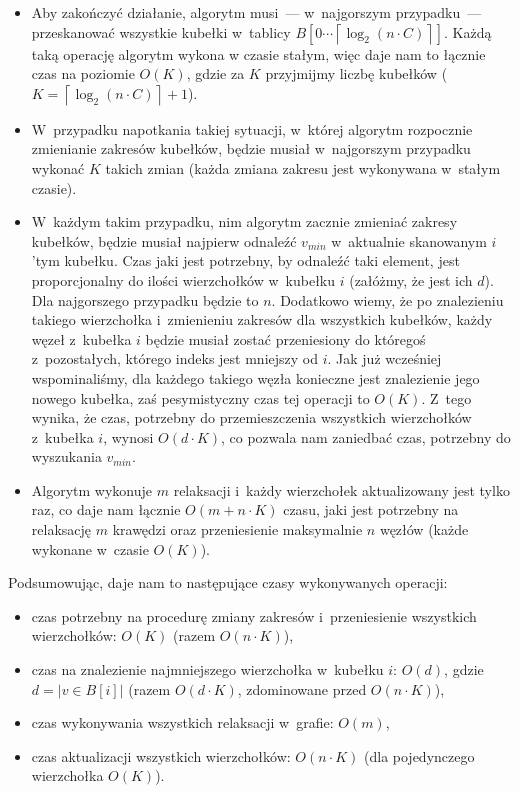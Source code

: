 \begin{itemize}
\item Aby zakończyć działanie, algorytm musi~--- w~najgorszym przypadku~--- przeskanować wszystkie kubełki w~tablicy $B \left[ 0 \cdots \left \lceil \log_{2} \left( n \cdot C \right) \right \rceil \right]$. Każdą taką operację algorytm wykona w czasie stałym, więc daje nam to łącznie czas na poziomie $O \left( K \right)$, gdzie za $K$ przyjmijmy liczbę kubełków ($K = \left \lceil \log_{2} \left( n \cdot C \right) \right \rceil + 1$).
\item W~przypadku napotkania takiej sytuacji, w~której algorytm rozpocznie zmienianie zakresów kubełków, będzie musiał w~najgorszym przypadku wykonać $K$ takich zmian (każda zmiana zakresu jest wykonywana w~stałym czasie).
\item W~każdym takim przypadku, nim algorytm zacznie zmieniać zakresy kubełków, będzie musiał najpierw odnaleźć $v_{min}$ w~aktualnie skanowanym $i$'tym kubełku. Czas jaki jest potrzebny, by odnaleźć taki element, jest proporcjonalny do ilości wierzchołków w~kubełku $i$ (załóżmy, że jest ich $d$). Dla najgorszego przypadku będzie to $n$. Dodatkowo wiemy, że po znalezieniu takiego wierzchołka i~zmienieniu zakresów dla wszystkich kubełków, każdy węzeł z~kubełka $i$ będzie musiał zostać przeniesiony do któregoś z~pozostałych, którego indeks jest mniejszy od $i$. Jak już wcześniej wspominaliśmy, dla każdego takiego węzła konieczne jest znalezienie jego nowego kubełka, zaś pesymistyczny czas tej operacji to $O \left( K \right)$. Z~tego wynika, że czas, potrzebny do przemieszczenia wszystkich wierzchołków z~kubełka $i$, wynosi $ O \left( d \cdot K \right)$, co pozwala nam zaniedbać czas, potrzebny do wyszukania $v_{min}$.
\item Algorytm wykonuje $m$ relaksacji i~każdy wierzchołek aktualizowany jest tylko raz, co daje nam łącznie $O \left( m + n \cdot K \right)$ czasu, jaki jest potrzebny na relaksację $m$ krawędzi oraz przeniesienie maksymalnie $n$ węzłów (każde wykonane w~czasie $O \left( K\right)$).
\end{itemize}

Podsumowując, daje nam to następujące czasy wykonywanych operacji:

\begin{itemize}
\item czas potrzebny na procedurę zmiany zakresów i~przeniesienie wszystkich wierzchołków: $ O \left( K \right)$ (razem $ O \left( n \cdot K \right)$),
\item czas na znalezienie najmniejszego wierzchołka w~kubełku $i$: $ O \left( d \right)$, gdzie $d = \left| v \in B \left[ i\right] \right|$ (razem $ O \left( d \cdot K \right)$, zdominowane przed $ O \left( n \cdot K \right)$),
\item czas wykonywania wszystkich relaksacji w~grafie: $ O \left( m \right) $,
\item czas aktualizacji wszystkich wierzchołków: $ O \left( n \cdot K \right)$ (dla pojedynczego wierzchołka $O \left( K\right)$).
\end{itemize}

